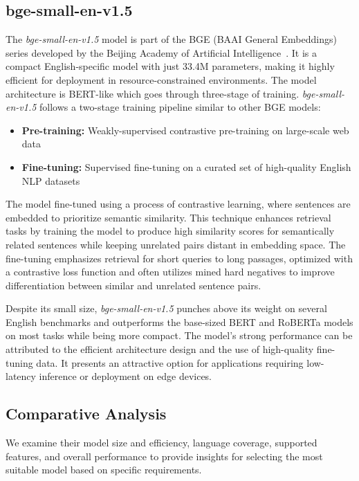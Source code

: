 \subsection{bge-small-en-v1.5}\label{subsec:baai}
The \textit{\textit{bge-small-en-v1.5}} model is part of the BGE (BAAI General Embeddings) series developed by the Beijing Academy of Artificial Intelligence~\cite{bge_embedding}.
It is a compact English-specific model with just 33.4M parameters, making it highly efficient for deployment in resource-constrained environments.
The model architecture is BERT-like which goes through three-stage of training.
\textit{\textit{bge-small-en-v1.5}} follows a two-stage training pipeline similar to other BGE models:
\begin{itemize}
    \item \textbf{Pre-training:} Weakly-supervised contrastive pre-training on large-scale web data
    \item \textbf{Fine-tuning:} Supervised fine-tuning on a curated set of high-quality English NLP datasets
\end{itemize}

The model fine-tuned using a process of contrastive learning, where sentences are embedded to prioritize semantic similarity.
This technique enhances retrieval tasks by training the model to produce high similarity scores for semantically related sentences while keeping unrelated pairs distant in embedding space.
The fine-tuning emphasizes retrieval for short queries to long passages, optimized with a contrastive loss function and often utilizes mined hard negatives to improve differentiation between similar and unrelated sentence pairs.

Despite its small size, \textit{\textit{bge-small-en-v1.5}} punches above its weight on several English benchmarks and outperforms the base-sized BERT and RoBERTa models on most tasks while being more compact.
The model's strong performance can be attributed to the efficient architecture design and the use of high-quality fine-tuning data.
It presents an attractive option for applications requiring low-latency inference or deployment on edge devices.

\subsection{Comparative Analysis}\label{subsec:comparative-analysis}
We examine their model size and efficiency, language coverage, supported features, and overall performance to provide insights for selecting the most suitable model based on specific requirements.

